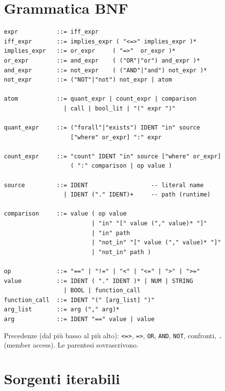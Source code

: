 \section{Grammatica BNF}
\label{sec:dsl-bnf}

\begin{lstlisting}[basicstyle=\ttfamily\small]
expr           ::= iff_expr
iff_expr       ::= implies_expr ( "<=>" implies_expr )*
implies_expr   ::= or_expr     ( "=>"  or_expr )*
or_expr        ::= and_expr    ( ("OR"|"or") and_expr )*
and_expr       ::= not_expr    ( ("AND"|"and") not_expr )*
not_expr       ::= ("NOT"|"not") not_expr | atom

atom           ::= quant_expr | count_expr | comparison
                 | call | bool_lit | "(" expr ")"

quant_expr     ::= ("forall"|"exists") IDENT "in" source
                   ["where" or_expr] ":" expr

count_expr     ::= "count" IDENT "in" source ["where" or_expr]
                   ( ":" comparison | op value )

source         ::= IDENT                  -- literal name
                 | IDENT ("." IDENT)+     -- path (runtime)

comparison     ::= value ( op value
                         | "in" "[" value ("," value)* "]"
                         | "in" path
                         | "not_in" "[" value ("," value)* "]"
                         | "not_in" path )

op             ::= "==" | "!=" | "<" | "<=" | ">" | ">="
value          ::= IDENT ( "." IDENT )* | NUM | STRING
                 | BOOL | function_call
function_call  ::= IDENT "(" [arg_list] ")"
arg_list       ::= arg ("," arg)*
arg            ::= IDENT "==" value | value
\end{lstlisting}

Precedenze (dal pi\`u basso al pi\`u alto):
\texttt{<=>}, \texttt{=>}, \texttt{OR}, \texttt{AND}, \texttt{NOT},
confronti, \texttt{.} (member access). Le parentesi sovrascrivono.

\section{Sorgenti iterabili}

